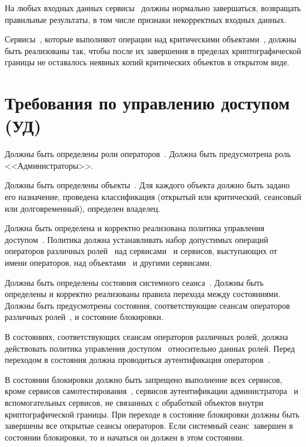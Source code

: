 
\label{InputProtect}
На любых входных данных сервисы~
должны нормально завершаться, \ie возвращать правильные результаты, 
в том числе признаки некорректных входных данных.

\label{LeakProtect}
Сервисы~, 
которые выполняют операции над критическими объектами~, 
должны быть реализованы так, чтобы после их завершения 
в пределах криптографической границы
не оставалось неявных копий критических объектов в открытом виде.

\section{Требования по управлению доступом (УД)}

\label{Roles}
Должны быть определены роли операторов~\TOE.
Должна быть предусмотрена роль <<Администраторы>>. 

\label{Objects}
Должны быть определены объекты~\TOE.
Для каждого объекта должно быть задано его назначение,
проведена классификация 
(открытый или критический, сеансовый или долговременный),
определен владелец.

\label{DAC}
Должна быть определена и корректно реализована 
политика управления доступом~\TOE.
Политика должна устанавливать набор допустимых 
операций операторов различных ролей~ 
над сервисами~  и сервисов, 
выступающих от имени операторов, над объектами~ 
и другими сервисами.

\label{States}
Должны быть определены состояния системного сеанса~\TOE.
Должны быть определены и корректно реализованы правила перехода между состояниями.
Должны быть предусмотрены состояния, соответствующие 
сеансам операторов различных ролей~, и состояние блокировки.

\label{OpStates}
В состояниях, соответствующих сеансам операторов различных ролей,
должна действовать политика управления доступом~
относительно данных ролей.
Перед переходом в состояния должна проводиться аутентификация
операторов~.

\label{LockState}
В состоянии блокировки должно быть запрещено выполнение всех
сервисов, кроме сервисов самотестирования~,
сервисов аутентификации администратора~ 
и вспомогательных сервисов, не связанных 
с обработкой объектов внутри криптографической границы.
%
При переходе в состояние блокировки должны быть завершены 
все открытые сеансы операторов. 
Если системный сеанс~\TOE завершен в состоянии блокировки,
то и начаться он должен в этом состоянии.

